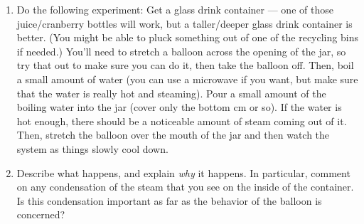 \begin{exercise}
  \begin{enumerate}

  \item Do the following experiment: Get a glass drink container ---
    one of those juice/cranberry bottles will work, but a
    taller/deeper glass drink container is better.  (You might be able
    to pluck something out of one of the recycling bins if needed.)
    You'll need to stretch a balloon across the opening of the jar, so
    try that out to make sure you can do it, then take the balloon
    off.  Then, boil a small amount of water (you can use a microwave
    if you want, but make sure that the water is really hot and
    steaming).  Pour a small amount of the boiling water into the jar
    (cover only the bottom cm or so).  If the water is hot enough,
    there should be a noticeable amount of steam coming out of it.
    Then, stretch the balloon over the mouth of the jar and then watch
    the system as things slowly cool down.

  \item Describe what happens, and explain \emph{why} it happens.  In
    particular, comment on any condensation of the steam that you see
    on the inside of the container.  Is this condensation important as
    far as the behavior of the balloon is concerned?

  \end{enumerate}
\end{exercise}



